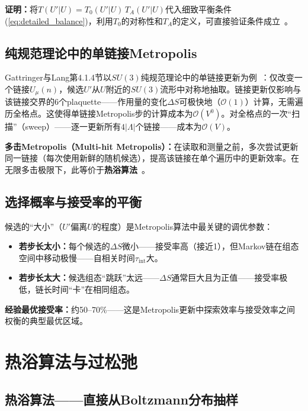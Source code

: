 \documentclass[12pt,a4paper]{ctexart}
\theoremstyle{definition}
\begin{document}
\textbf{证明：}将$T(U'|U) = T_0(U'|U) \, T_A(U'|U)$代入细致平衡条件(\ref{eq:detailed_balance})，利用$T_0$的对称性和$T_A$的定义，可直接验证条件成立~\cite{GattringerLang2010}。

\subsection{纯规范理论中的单链接Metropolis}

Gattringer与Lang第4.1.4节以$SU(3)$纯规范理论中的单链接更新为例~\cite{GattringerLang2010}：仅改变一个链接$U_\mu(n)$，候选$U'$从$U$附近的$SU(3)$流形中对称地抽取。链接更新仅影响与该链接交界的6个plaquette——作用量的变化$\Delta S$可极快地（$\mathcal{O}(1)$）计算，无需遍历全格点。这使得单链接Metropolis步的计算成本为$\mathcal{O}(V^0)$。对全格点的一次``扫描''（sweep）——逐一更新所有$4|\Lambda|$个链接——成本为$\mathcal{O}(V)$。

\textbf{多击Metropolis（Multi-hit Metropolis）：}在读取和测量之前，多次尝试更新同一链接（每次使用新鲜的随机候选），提高该链接在单个遍历中的更新效率。在无限多击极限下，此等价于\textbf{热浴算法}~\cite{GattringerLang2010}。

\subsection{选择概率与接受率的平衡}

候选的``大小''（$U'$偏离$U$的程度）是Metropolis算法中最关键的调优参数：
\begin{itemize}[nosep]
    \item \textbf{若步长太小：}每个候选的$\Delta S$微小——接受率高（接近1），但Markov链在组态空间中移动极慢——自相关时间$\tau_{\text{int}}$大。
    \item \textbf{若步长太大：}候选组态``跳跃''太远——$\Delta S$通常巨大且为正值——接受率极低，链长时间``卡''在相同组态。
\end{itemize}
\textbf{经验最优接受率：}约50--70\%——这是Metropolis更新中探索效率与接受效率之间权衡的典型最优区域。

\section{热浴算法与过松弛}

\subsection{热浴算法——直接从Boltzmann分布抽样}
\end{document}
